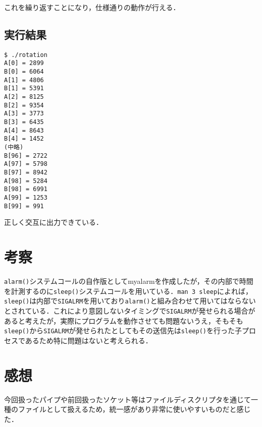 \documentclass[a4j,10pt,titlepage]{jsarticle}
\begin{document}
これを繰り返すことになり，仕様通りの動作が行える．

\subsection{実行結果}
\begin{verbatim}
$ ./rotation 
A[0] = 2899
B[0] = 6064
A[1] = 4806
B[1] = 5391
A[2] = 8125
B[2] = 9354
A[3] = 3773
B[3] = 6435
A[4] = 8643
B[4] = 1452
(中略)
B[96] = 2722
A[97] = 5798
B[97] = 8942
A[98] = 5284
B[98] = 6991
A[99] = 1253
B[99] = 991
\end{verbatim}

正しく交互に出力できている．

\section{考察}
\verb|alarm()|システムコールの自作版としてmyalarmを作成したが，その内部で時間を計測するのに\verb|sleep()|システムコールを用いている．\verb|man 3 sleep|によれば，\verb|sleep()|は内部で\verb|SIGALRM|を用いており\verb|alarm()|と組み合わせて用いてはならないとされている．これにより意図しないタイミングで\verb|SIGALRM|が発せられる場合があると考えたが，実際にプログラムを動作させても問題ないうえ，そもそも\verb|sleep()|から\verb|SIGALRM|が発せられたとしてもその送信先は\verb|sleep()|を行った子プロセスであるため特に問題はないと考えられる．

\section{感想}
今回扱ったパイプや前回扱ったソケット等はファイルディスクリプタを通じて一種のファイルとして扱えるため，統一感があり非常に使いやすいものだと感じた．
\end{document}
